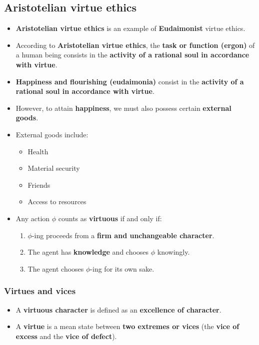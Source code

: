 \documentclass[11pt]{article}
\begin{document}
\subsection{Aristotelian virtue ethics}
\label{sec:org716e929}
\begin{itemize}
\item \textbf{Aristotelian virtue ethics} is an example of \textbf{Eudaimonist} virtue ethics.
\item According to \textbf{Aristotelian virtue ethics}, the \textbf{task or function (ergon)} of a human being consists in the \textbf{activity of a rational soul in accordance with virtue}.
\item \textbf{Happiness and flourishing (eudaimonia)} consist in the \textbf{activity of a rational soul in accordance with virtue}.
\item However, to attain \textbf{happiness}, we must also possess certain \textbf{external goods}.
\item External goods include:
\begin{itemize}
\item Health
\item Material security
\item Friends
\item Access to resources
\end{itemize}
\item Any action \(\phi\) counts as \textbf{virtuous} if and only if:
\begin{enumerate}
\item \(\phi\)-ing proceeds from a \textbf{firm and unchangeable character}.
\item The agent has \textbf{knowledge} and chooses \(\phi\) knowingly.
\item The agent chooses \(\phi\)-ing for its own sake.
\end{enumerate}
\end{itemize}
\subsubsection{Virtues and vices}
\label{sec:orgb86134d}
\begin{itemize}
\item A \textbf{virtuous character} is defined as an \textbf{excellence of character}.
\item A \textbf{virtue} is a mean state between \textbf{two extremes or vices} (the \textbf{vice of excess} and the \textbf{vice of defect}).
\end{itemize}
\end{document}
